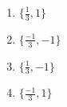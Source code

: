 \documentclass[article,12pt,onecolumn]{IEEEtran}
\theoremstyle{remark}
\begin{document}
\begin{enumerate}[start=40]
\hfill {}
\begin{multicols}{2}
\begin{enumerate}
    \item $\{\frac{1}{3},1\}$
    \item $\{\frac{-1}{3},-1\}$
    \item $\{\frac{1}{3},-1\}$ 
    \item $\{\frac{-1}{3},1\}$
\end{enumerate}
\end{multicols}
\end{enumerate}
\end{document}
